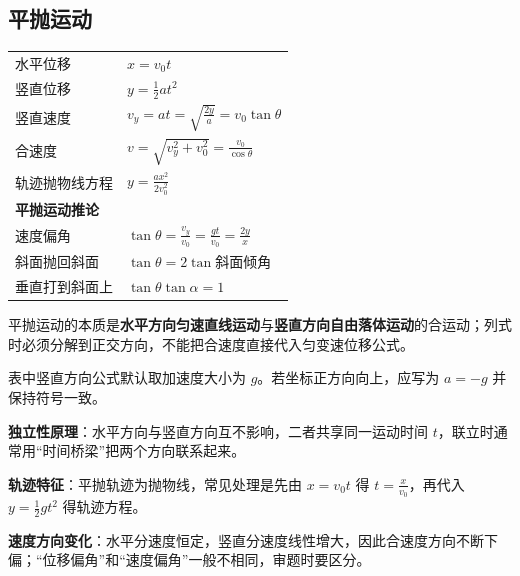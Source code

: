 \subsection{平抛运动}
\begin{tabularx}{\columnwidth}{XX}
  水平位移    & $x=v_0 t$                                                \\
  竖直位移    & $y=\frac12 a t^2$                                        \\
  竖直速度    & $v_y=a t=\sqrt{\frac{2y}{a}}=v_0\tan\theta$              \\
  合速度     & $v=\sqrt{v_y^2+v_0^2}=\frac{v_0}{\cos\theta}$            \\
  轨迹抛物线方程 & $y=\frac{ax^2}{2v_0^2}$                                  \\
  \multicolumn{2}{l}{\textbf{平抛运动推论}}                                \\
  速度偏角    & $\tan\theta=\frac{v_y}{v_0}=\frac{gt}{v_0}=\frac{2y}{x}$ \\
  斜面抛回斜面  & $\tan\theta=2\tan\text{斜面倾角}$                            \\
  垂直打到斜面上 & $\tan\theta \tan\alpha = 1 $                             \\
\end{tabularx}

\begin{formulanotebox}
  平抛运动的本质是\textbf{水平方向匀速直线运动}与\textbf{竖直方向自由落体运动}的合运动；列式时必须分解到正交方向，不能把合速度直接代入匀变速位移公式。

  表中竖直方向公式默认取加速度大小为 $g$。若坐标正方向向上，应写为 $a=-g$ 并保持符号一致。
\end{formulanotebox}

\begin{keypointbox}
  \textbf{独立性原理}：水平方向与竖直方向互不影响，二者共享同一运动时间 $t$，联立时通常用“时间桥梁”把两个方向联系起来。

  \textbf{轨迹特征}：平抛轨迹为抛物线，常见处理是先由 $x=v_0t$ 得 $t=\frac{x}{v_0}$，再代入 $y=\frac{1}{2}gt^2$ 得轨迹方程。

  \textbf{速度方向变化}：水平分速度恒定，竖直分速度线性增大，因此合速度方向不断下偏；“位移偏角”和“速度偏角”一般不相同，审题时要区分。
\end{keypointbox}

